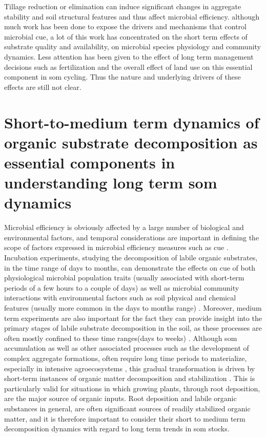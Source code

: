 		Tillage reduction or elimination can induce significant changes in aggregate stability and soil structural features \citep{alvaro-fuentes2009, barreto2009} and thus affect microbial efficiency.
		although much work has been done to expose the drivers and mechanisms that control microbial \gls{cue}, a lot of this work has concentrated on the short term effects of substrate quality and availability, on microbial species physiology and community dynamics. Less attention has been given to the effect of long term management decisions such as fertilization and the overall effect of land use on this essential component in \gls{som} cycling. Thus the nature and underlying drivers of these effects are still not clear.

\section{Short-to-medium term dynamics of organic substrate decomposition as essential components in understanding long term \gls{som} dynamics}

		Microbial efficiency is obviously affected by a large number of biological and environmental factors, and temporal considerations are important in defining the scope of factors expressed in microbial efficiency measures such as \gls{cue} \citep{kallenbach2019}. Incubation experiments, studying the decomposition of labile organic substrates, in the time range of days to months,  can demonstrate the effects on \gls{cue} of both physiological microbial population traits (usually associated with short-term periods of a few hours to a couple of days) as well as microbial community interactions with environmental factors such as soil physical and chemical features (usually more common in the days to months range) \citep{geyer2016, manzoni2018}. Moreover, medium term experiments are also important for the fact they can provide insight into the primary stages of labile substrate decomposition in the soil, as these processes are often mostly confined to these time ranges(days to weeks) \citep{blagodatskaya2011, schneckenberger2008, tian2015}. Although \gls{som} accumulation as well as other associated processes such as the development of complex aggregate formations, often require long time periods to materialize, especially in intensive agroecosystems \citep{grandy2007}, this gradual transformation is driven by short-term instances of organic matter decomposition and stabilization \citep{kuzyakov2015}. This is particularly valid for situations in which growing plants, through root deposition, are the major source of organic inputs. Root deposition and labile organic substances in general, are often significant sources of readily stabilized organic matter, and it is therefore important to consider their short to medium term decomposition dynamics with regard to long term trends in \gls{som} stocks.

